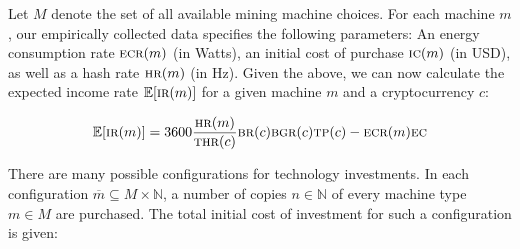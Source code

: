 \begin{table}
  \centering
  \caption{The parameters to our proof-of-work mining simulations. Some depend on the cryptocurrency $c$.}
  \label{tbl:work-constants}
\end{table}



Let $M$ denote the set of all available mining machine choices. For each machine
$m$, our empirically collected data specifies the following parameters: An
energy consumption rate $\textsc{ecr}(m)$ (in Watts), an initial cost of purchase $\textsc{ic}(m)$
(in USD), as well as a hash rate $\textsc{hr}(m)$ (in Hz). Given the above, we can now
calculate the expected income rate $\mathbb{E}[\textsc{ir}(m)]$ for a given machine $m$
and a cryptocurrency $c$:

\[
\mathbb{E}[\textsc{ir}(m)] = 3600 \frac{\textsc{hr}(m)}{\textsc{thr}(c)}\textsc{br}(c)\textsc{bgr}(c)\textsc{tp}(c) - \textsc{ecr}(m) \textsc{ec}
\]

There are many possible configurations for technology investments. In each
configuration $\overline{m} \subseteq M \times \mathbb{N}$, a number of copies
$n \in \mathbb{N}$ of every machine type $m \in M$ are purchased. The total
initial cost of investment for such a configuration is given:

